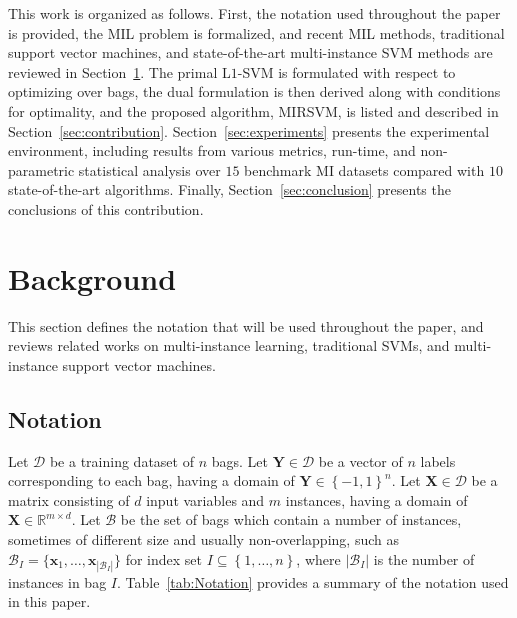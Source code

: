 \documentclass[preprint,12pt]{elsarticle}
\newcommand{\set}[1]{{\left\{#1\right\}}}
\begin{document}
This work is organized as follows. First, the notation used throughout the paper is provided, the MIL problem is formalized, and recent MIL methods, traditional support vector machines, and state-of-the-art multi-instance SVM methods are reviewed in Section~\ref{sec:background}. The primal L$1$-SVM is formulated with respect to optimizing over bags, the dual formulation is then derived along with conditions for optimality, and the proposed algorithm, MIRSVM, is listed and described in Section~\ref{sec:contribution}. Section~\ref{sec:experiments} presents the experimental environment, including results from various metrics, run-time, and non-parametric statistical analysis over $15$ benchmark MI datasets compared with $10$ state-of-the-art algorithms. Finally, Section~\ref{sec:conclusion} presents the conclusions of this contribution.

\section{Background}\label{sec:background}
This section defines the notation that will be used throughout the paper, and reviews related works on multi-instance learning, traditional SVMs, and multi-instance support vector machines.

\subsection{Notation}\label{subsec:notation}
Let $\mathcal{D}$ be a training dataset of $n$ bags. Let $\bm{Y} \in \mathcal{D}$ be a vector of $n$ labels corresponding to each bag, having a domain of $\bm{Y} \in \set{-1,1}^n$. Let $\bm{X} \in \mathcal{D}$ be a matrix consisting of $d$ input variables and $m$ instances, having a domain of $\bm{X} \in \mathbb{R}^{m \times d}$. Let $\mathcal{B}$ be the set of bags which contain a number of instances, sometimes of different size and usually non-overlapping, such as $\mathcal{B}_I = \{\bm x_{1}, \ldots, \bm x_{|\mathcal{B}_I|}\}$ for index set $I \subseteq \set{1,\ldots,n}$, where $|\mathcal{B}_I|$ is the number of instances in bag $I$. Table~\ref{tab:Notation} provides a summary of the notation used in this paper.
\end{document}
